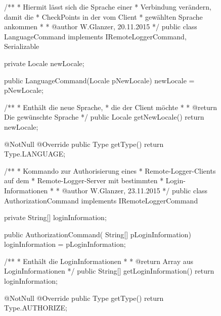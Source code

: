 \begin{figure}[h]
    \centering
    \begin{minipage}{0.5\textwidth}
	    \begin{spacing}{0.75}
		    \begin{javacode}
/**
* Hiermit lässt sich die Sprache einer 
* Verbindung verändern, damit die
* CheckPoints in der vom Client 
* gewählten Sprache ankommen
*
* @author W.Glanzer, 20.11.2015
*/
public class LanguageCommand implements 
	IRemoteLoggerCommand, Serializable
{

  private Locale newLocale;

  public LanguageCommand(Locale pNewLocale)
  {
    newLocale = pNewLocale;
  }

  /**
  * Enthält die neue Sprache, 
  * die der Client möchte
  *
  * @return Die gewünschte Sprache
  */
  public Locale getNewLocale()
  {
    return newLocale;
  }

  @NotNull
  @Override
  public Type getType()
  {
    return Type.LANGUAGE;
  }
}		    \end{javacode}
		\end{spacing}
    \end{minipage}
    \hfill
    \begin{minipage}{0.49\textwidth}
	    \begin{spacing}{0.75}
		    \begin{javacode}
/**
 * Kommando zur Authorisierung eines 
 * Remote-Logger-Clients auf dem
 * Remote-Logger-Server mit bestimmten
 * Login-Informationen
 *
 * @author W.Glanzer, 23.11.2015
 */
public class AuthorizationCommand 
    implements IRemoteLoggerCommand
{

  private String[] loginInformation;

  public AuthorizationCommand(
        String[] pLoginInformation)
  {
    loginInformation = pLoginInformation;
  }

 /**
  * Enthält die LoginInformationen
  *
  * @return Array aus LoginInformationen
  */
  public String[] getLoginInformation()
  {
    return loginInformation;
  }

  @NotNull
  @Override
  public Type getType()
  {
    return Type.AUTHORIZE;
  }
}		    \end{javacode}
	    \end{spacing}
    \end{minipage}
\end{figure}